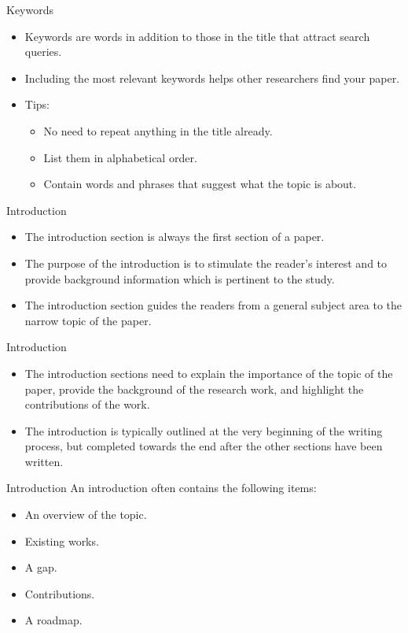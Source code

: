 \documentclass{beamer}
\begin{document}
    
    \begin{frame}{Keywords}
    \begin{itemize}
        \item Keywords are words in addition to those in the title that attract search queries.
        \item Including the most relevant keywords helps other researchers find your paper.
        \item Tips:
        \begin{itemize}
            \item No need to repeat anything in the title already.
            \item List them in alphabetical order.
            \item Contain words and phrases that suggest what the topic is about.
        \end{itemize}
    \end{itemize}
    \end{frame}
    
    
    \begin{frame}{Introduction}
    \begin{itemize}
        \item The introduction section is always the first section of a paper.
        \item The purpose of the introduction is to stimulate the reader’s interest and to provide background information which is pertinent to the study.
        \item The introduction section guides the readers from a general subject area to the narrow topic of the paper.
    \end{itemize}
    \end{frame}
    
    
    \begin{frame}{Introduction}
    \begin{itemize}
        \item The introduction sections need to explain the importance of the topic of the paper, provide the background of the research work, and highlight the contributions of the work.
        \item The introduction is typically outlined at the very beginning of the writing process, but completed towards the end after the other sections have been written.
    \end{itemize}
    \end{frame}
    
    
    \begin{frame}{Introduction}
    An introduction often contains the following items:
    \begin{itemize}
        \item An overview of the topic.
        \item Existing works.
        \item A gap.
        \item Contributions.
        \item A roadmap.
    \end{itemize}
    \end{frame}
    
\end{document}
